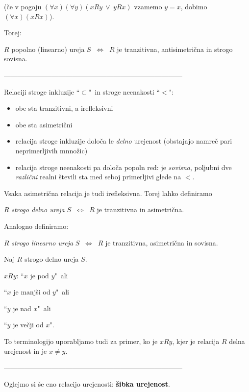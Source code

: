 \documentclass[11pt,paper=b5,footinclude,headinclude]{scrbook} %
\def\ali {{~\vee~}}
\def\cee {{~\Leftrightarrow~}}
\begin{document}
(če v pogoju $(\forall x)(\forall y)(xRy \ali yRx)$ vzamemo $y = x$, dobimo
$(\forall x)(xRx)$).

Torej:

$R$ {popolno (linearno) ureja} $S$ $\cee$ $R$ je tranzitivna, antisimetrična in strogo sovisna.

\bigskip

------------------------------------------------------------------------------


\bigskip

\newpage
Relaciji stroge inkluzije ``$\subset$"~in stroge neenakosti ``$<$":
\begin{itemize}
  \item obe sta tranzitivni, a irefleksivni
  \item obe sta asimetrični
  \item relacija stroge inkluzije določa le {\em delno} urejenost (obstajajo namreč pari neprimerljivih mnnožic)
  \item relacija stroge neenakosti pa določa popoln red: je {\em sovisna}, poljubni dve {\em različni} realni števili sta med seboj primerljivi glede na $<$.
\end{itemize}

Vsaka asimetrična relacija je tudi irefleksivna. Torej lahko definiramo

$R$ {\em strogo delno ureja} $S$ $\cee$ $R$ je tranzitivna in asimetrična.

\bigskip

Analogno definiramo:

\medskip
$R$ {\em strogo linearno ureja} $S$ $\cee$ $R$ je tranzitivna, asimetrična in sovisna.

\bigskip

Naj $R$ strogo delno ureja $S$.

$xRy$: ``$x$ je pod  $y$"~ali

``$x$ je manjši od $y$"~ali

``$y$ je nad $x$"~ali

``$y$ je večji od  $x$".


\medskip
To terminologijo uporabljamo tudi za primer, ko je $xRy$, kjer je relacija $R$ delna urejenost in je $x\neq y$.

------------------------------------------------------------------------------

\bigskip

Oglejmo si še eno relacijo urejenosti: \textbf{ šibka urejenost}.
\end{document}
